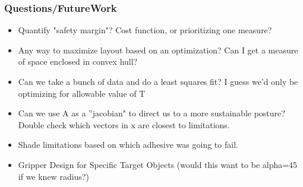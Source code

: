 \documentclass{beamer}
\begin{document}
\frame
{
\frametitle{ Questions/FutureWork }

\begin{itemize}


	\item Quantify "safety margin"? Cost function, or prioritizing one measure? 
	\item Any way to maximize layout based on an optimization? Can I get a measure of space enclosed in convex hull? 
	\item Can we take a bunch of data and do a least squares fit? I guess we'd only be optimizing for allowable value of T
	\item Can we use A as a ''jacobian" to direct us to a more sustainable posture? Double check which vectors in x are closest to limitations. 
	\item Shade limitations based on which adhesive was going to fail. 
	\item Gripper Design for Specific Target Objects (would this want to be alpha=45 if we knew radius?)	
	
\end{itemize}

}
\end{document}
